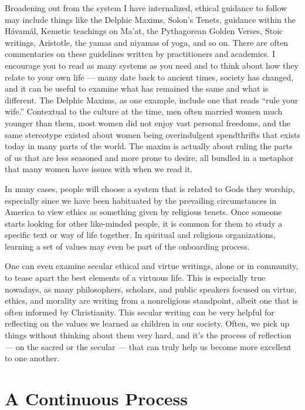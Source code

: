 \documentclass[
]{book}
\begin{document}
Broadening out from the system I have internalized, ethical guidance to follow may include things like the Delphic Maxims, Solon's Tenets, guidance within the Hávamál, Kemetic teachings on Ma'at, the Pythagorean Golden Verses, Stoic writings, Aristotle, the yamas and niyamas of yoga, and so on. There are often commentaries on these guidelines written by practitioners and academics. I encourage you to read as many systems as you need and to think about how they relate to your own life --- many date back to ancient times, society has changed, and it can be useful to examine what has remained the same and what is different. The Delphic Maxims, as one example, include one that reads ``rule your wife.'' Contextual to the culture at the time, men often married women much younger than them, most women did not enjoy vast personal freedoms, and the same stereotype existed about women being overindulgent spendthrifts that exists today in many parts of the world. The maxim is actually about ruling the parts of us that are less seasoned and more prone to desire, all bundled in a metaphor that many women have issues with when we read it.

In many cases, people will choose a system that is related to Gods they worship, especially since we have been habituated by the prevailing circumstances in America to view ethics as something given by religious tenets. Once someone starts looking for other like-minded people, it is common for them to study a specific text or way of life together. In spiritual and religious organizations, learning a set of values may even be part of the onboarding process.

One can even examine secular ethical and virtue writings, alone or in community, to tease apart the best elements of a virtuous life. This is especially true nowadays, as many philosophers, scholars, and public speakers focused on virtue, ethics, and morality are writing from a nonreligious standpoint, albeit one that is often informed by Christianity. This secular writing can be very helpful for reflecting on the values we learned as children in our society. Often, we pick up things without thinking about them very hard, and it's the process of reflection --- on the sacred or the secular --- that can truly help us become more excellent to one another.

\hypertarget{a-continuous-process}{%
\section{A Continuous Process}\label{a-continuous-process}}
\end{document}
